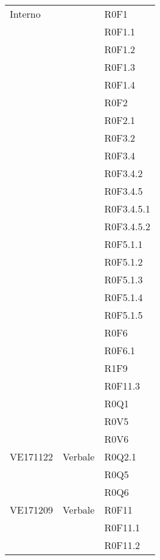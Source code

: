 \documentclass[AnalisiDeiRequisiti.tex]{subfiles}
\begin{document}
\begin{longtable}[H]{p{2cm}p{5cm}p{5cm}}
	Interno & & R0F1 \\
	& & R0F1.1 \\
	& & R0F1.2 \\
	& & R0F1.3 \\
	& & R0F1.4 \\
	& & R0F2 \\
	& & R0F2.1 \\
	& & R0F3.2 \\
	& & R0F3.4 \\
	& & R0F3.4.2 \\
	& & R0F3.4.5 \\
	& & R0F3.4.5.1 \\
	& & R0F3.4.5.2 \\
	& & R0F5.1.1 \\
	& & R0F5.1.2 \\
	& & R0F5.1.3 \\
	& & R0F5.1.4 \\
	& & R0F5.1.5 \\
	& & R0F6 \\
	& & R0F6.1 \\
	& & R1F9 \\
	& & R0F11.3 \\
	& & R0Q1 \\
	& & R0V5 \\
	& & R0V6 \\  
	
	VE171122 & Verbale & R0Q2.1 \\
	& & R0Q5 \\
	& & R0Q6 \\  
	
	VE171209 & Verbale & R0F11 \\
	& & R0F11.1 \\
	& & R0F11.2 \\  
	

\end{longtable}
\end{document}
